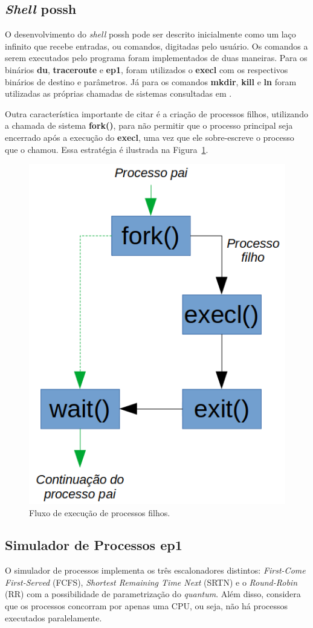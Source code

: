 \documentclass[12pt]{article}
\begin{document}
\subsection{\textit{Shell} possh}

O desenvolvimento do \textit{shell} possh pode ser descrito inicialmente como um laço infinito que recebe entradas, ou comandos, digitadas pelo usuário. Os comandos a serem executados pelo programa foram implementados de duas maneiras. Para os binários \textbf{du}, \textbf{traceroute} e \textbf{ep1}, foram utilizados o \textbf{execl} com os respectivos binários de destino e parâmetros. Já para os comandos \textbf{mkdir}, \textbf{kill} e \textbf{ln} foram utilizadas as próprias chamadas de sistemas consultadas em \cite{kerrisk:20}.

Outra característica importante de citar é a criação de processos filhos, utilizando a chamada de sistema \textbf{fork()}, para não permitir que o processo principal seja encerrado após a execução do \textbf{execl}, uma vez que ele sobre-escreve o processo que o chamou. Essa estratégia é ilustrada na Figura~\ref{fig:fork}.
\begin{figure}[H]
	\centering
	\includegraphics[width=.4\textwidth]{fork.png}
	\caption{Fluxo de execução de processos filhos.}
	\label{fig:fork}
\end{figure}

\subsection{Simulador de Processos ep1}

O simulador de processos implementa os três escalonadores distintos: \textit{First-Come First-Served} (FCFS), \textit{Shortest Remaining Time Next} (SRTN) e o \textit{Round-Robin} (RR) com a possibilidade de parametrização do \textit{quantum}. Além disso, considera que os processos concorram por apenas uma CPU, ou seja, não há processos executados paralelamente.
\end{document}
